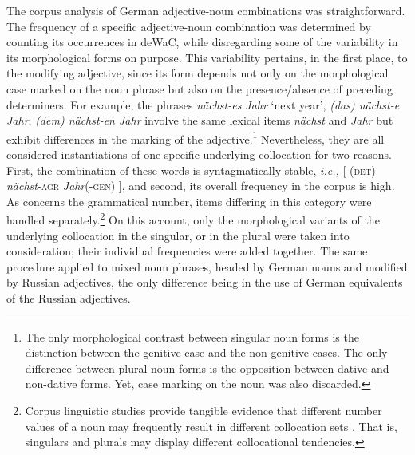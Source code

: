The corpus analysis of German adjective-noun combinations was straightforward. The frequency of a specific adjective-noun combination was determined by counting its occurrences in deWaC, while disregarding some of the variability in its morphological forms on purpose. This variability pertains, in the first place, to the modifying adjective, since its form depends not only on the morphological case marked on the noun phrase but also on the presence/absence of preceding determiners. For example, the phrases \textit{nächst-es Jahr} `next year', \textit{(das) nächst-e Jahr}, \textit{(dem) nächst-en Jahr} involve the same lexical items \textit{nächst} and \textit{Jahr} but exhibit differences in the marking of the adjective.\footnote{The only morphological contrast between singular noun forms is the distinction between the genitive case and the non-genitive cases. The only difference between plural noun forms is the opposition between dative and non-dative forms. Yet, case marking on the noun was also discarded.} Nevertheless, they are all considered instantiations of one specific underlying collocation for two reasons. First, the combination of these words is syntagmatically stable, \textit{i.e.,} $[$ {(\textsc{det}) \textit{nächst}-\textsc{agr}} \textit{Jahr}(-\textsc{gen}) $]$, and second, its overall frequency in the corpus is high. As concerns the grammatical number, items differing in this category were handled separately.\footnote{Corpus linguistic studies provide tangible evidence that different number values of a noun may frequently result in different collocation sets \citep[e.g.,][167-172]{sinclair2003}. That is, singulars and plurals may display different collocational tendencies.} On this account, only the morphological variants of the underlying collocation in the singular, or in the plural were taken into consideration; their individual frequencies were added together. The same procedure applied to mixed noun phrases, headed by German nouns and modified by Russian adjectives, the only difference being in the use of German equivalents of the Russian adjectives.

